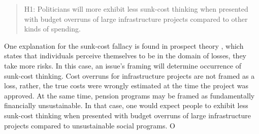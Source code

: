\begin{quote}
  H1: Politicians will more exhibit less sunk-cost thinking when presented with budget overruns of large infrastructure projects compared to other kinds of spending.
\end{quote}


One explanation for the sunk-cost fallacy is found in prospect theory \parencites{Kahnemann1979}{Arkes1985}, which states that individuals perceive themselves to be in the domain of losses, they take more risks. In this case, an issue's framing will determine occurrence of sunk-cost thinking. Cost overruns for infrastructure projects are not framed as a loss, rather, the true costs were wrongly estimated at the time the project was approved. At the same time, pension programs may be framed as fundamentally financially unsustainable. In that case, one would expect people to exhibit less sunk-cost thinking when presented with budget overruns of large infrastructure projects compared to unsustainable social programs. O
